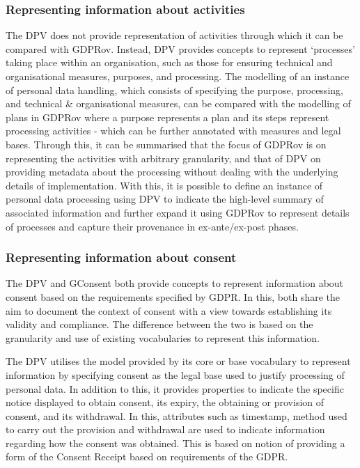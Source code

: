 \subsubsection{Representing information about activities}
The DPV does not provide representation of activities through which it can be compared with GDPRov.
Instead, DPV provides concepts to represent `processes' taking place within an organisation, such as those for ensuring technical and organisational measures, purposes, and processing.
The modelling of an instance of personal data handling, which consists of specifying the purpose, processing, and technical \& organisational measures, can be compared with the modelling of plans in GDPRov where a purpose represents a plan and its steps represent processing activities - which can be further annotated with measures and legal bases.
Through this, it can be summarised that the focus of GDPRov is on representing the activities with arbitrary granularity, and that of DPV on providing metadata about the processing without dealing with the underlying details of implementation. With this, it is possible to define an instance of personal data processing using DPV to indicate the high-level summary of associated information and further expand it using GDPRov to represent details of processes and capture their provenance in ex-ante/ex-post phases.

\subsubsection{Representing information about consent}
The DPV and GConsent both provide concepts to represent information about consent based on the requirements specified by GDPR.
In this, both share the aim to document the context of consent with a view towards establishing its validity and compliance.
The difference between the two is based on the granularity and use of existing vocabularies to represent this information.

The DPV utilises the model provided by its core or base vocabulary to represent information by specifying consent as the legal base used to justify processing of personal data.
In addition to this, it provides properties to indicate the specific notice displayed to obtain consent, its expiry, the obtaining or provision of consent, and its withdrawal.
In this, attributes such as timestamp, method used to carry out the provision and withdrawal are used to indicate information regarding how the consent was obtained.
This is based on notion of providing a form of the Consent Receipt based on requirements of the GDPR.

